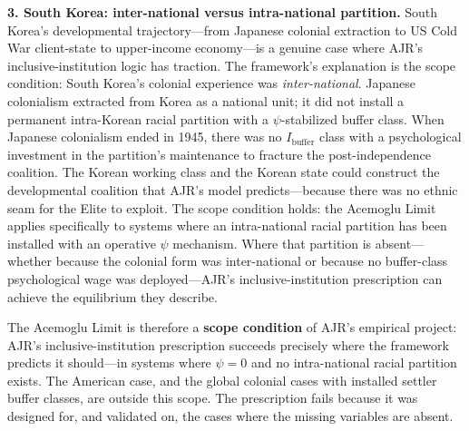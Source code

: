 \textbf{3. South Korea: inter-national versus intra-national partition.} South Korea's developmental trajectory---from Japanese colonial extraction to US Cold War client-state to upper-income economy---is a genuine case where AJR's inclusive-institution logic has traction. The framework's explanation is the scope condition: South Korea's colonial experience was \textit{inter-national}. Japanese colonialism extracted from Korea as a national unit; it did not install a permanent intra-Korean racial partition with a $\psi$-stabilized buffer class. When Japanese colonialism ended in 1945, there was no $I_{\text{buffer}}$ class with a psychological investment in the partition's maintenance to fracture the post-independence coalition. The Korean working class and the Korean state could construct the developmental coalition that AJR's model predicts---because there was no ethnic seam for the Elite to exploit. The scope condition holds: the Acemoglu Limit applies specifically to systems where an intra-national racial partition has been installed with an operative $\psi$ mechanism. Where that partition is absent---whether because the colonial form was inter-national or because no buffer-class psychological wage was deployed---AJR's inclusive-institution prescription can achieve the equilibrium they describe.

The Acemoglu Limit is therefore a \textbf{scope condition} of AJR's empirical project: AJR's inclusive-institution prescription succeeds precisely where the framework predicts it should---in systems where $\psi = 0$ and no intra-national racial partition exists. The American case, and the global colonial cases with installed settler buffer classes, are outside this scope. The prescription fails because it was designed for, and validated on, the cases where the missing variables are absent.

